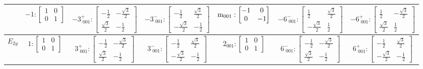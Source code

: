 \documentclass[fleqn,8pt,landscape]{jsarticle}
\begin{document}
\begin{longtable}{ccccccc}
& $ -1:\begin{bmatrix} 1 & 0 \\ 0 & 1 \end{bmatrix} $ & $ -3^{+}_{\,\,001}:\begin{bmatrix} - \frac{1}{2} & - \frac{\sqrt{3}}{2} \\ \frac{\sqrt{3}}{2} & - \frac{1}{2} \end{bmatrix} $ & $ -3^{-}_{\,\,001}:\begin{bmatrix} - \frac{1}{2} & \frac{\sqrt{3}}{2} \\ - \frac{\sqrt{3}}{2} & - \frac{1}{2} \end{bmatrix} $ & $ {\rm m}_{001}:\begin{bmatrix} -1 & 0 \\ 0 & -1 \end{bmatrix} $ & $ -6^{-}_{\,\,001}:\begin{bmatrix} \frac{1}{2} & \frac{\sqrt{3}}{2} \\ - \frac{\sqrt{3}}{2} & \frac{1}{2} \end{bmatrix} $ & $ -6^{+}_{\,\,001}:\begin{bmatrix} \frac{1}{2} & - \frac{\sqrt{3}}{2} \\ \frac{\sqrt{3}}{2} & \frac{1}{2} \end{bmatrix} $ \\ \hline
$ E_{2g} $ & $ 1:\begin{bmatrix} 1 & 0 \\ 0 & 1 \end{bmatrix} $ & $ 3^{+}_{\,\,001}:\begin{bmatrix} - \frac{1}{2} & - \frac{\sqrt{3}}{2} \\ \frac{\sqrt{3}}{2} & - \frac{1}{2} \end{bmatrix} $ & $ 3^{-}_{\,\,001}:\begin{bmatrix} - \frac{1}{2} & \frac{\sqrt{3}}{2} \\ - \frac{\sqrt{3}}{2} & - \frac{1}{2} \end{bmatrix} $ & $ 2{}_{001}:\begin{bmatrix} 1 & 0 \\ 0 & 1 \end{bmatrix} $ & $ 6^{-}_{\,\,001}:\begin{bmatrix} - \frac{1}{2} & - \frac{\sqrt{3}}{2} \\ \frac{\sqrt{3}}{2} & - \frac{1}{2} \end{bmatrix} $ & $ 6^{+}_{\,\,001}:\begin{bmatrix} - \frac{1}{2} & \frac{\sqrt{3}}{2} \\ - \frac{\sqrt{3}}{2} & - \frac{1}{2} \end{bmatrix} $ \\

\end{longtable}
\end{document}
